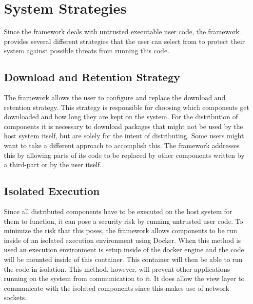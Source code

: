 \section{System Strategies}

Since the framework deals with untrusted executable user code, the framework provides several different strategies that the user can select from to protect their system against possible threats from running this code.

\subsection{Download and Retention Strategy}

The framework allows the user to configure and replace the download and retention strategy. This strategy is responsible for choosing which components get downloaded and how long they are kept on the system. For the distribution of components it is necessary to download packages that might not be used by the host system itself, but are solely for the intent of distributing. Some users might want to take a different approach to accomplish this. The framework addresses this by allowing parts of its code to be replaced by other components written by a third-part or by the user itself.

\subsection{Isolated Execution}

Since all distributed components have to be executed on the host system for them to function, it can pose a security risk by running untrusted user code. To minimize the risk that this poses, the framework allows components to be run inside of an isolated execution environment using Docker. When this method is used an execution environment is setup inside of the docker engine and the code will be mounted inside of this container. This container will then be able to run the code in isolation. This method, however, will prevent other applications running on the system from communication to it. It does allow the view layer to communicate with the isolated components since this makes use of network sockets.

